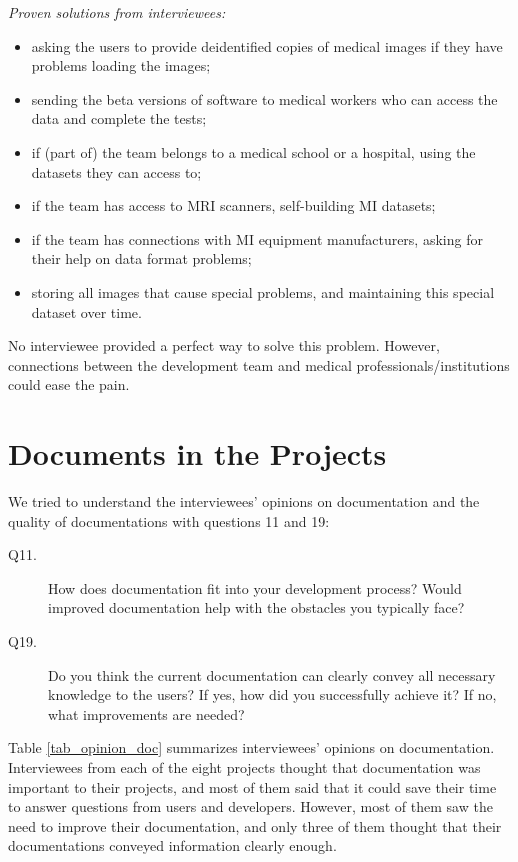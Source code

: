 \noindent\textit{Proven solutions from interviewees:}
\begin{itemize}
\item asking the users to provide deidentified copies of medical images if they have problems loading the images;
\item sending the beta versions of software to medical workers who can access the data and complete the tests;
\item if (part of) the team belongs to a medical school or a hospital, using the datasets they can access to;
\item if the team has access to MRI scanners, self-building MI datasets;
\item if the team has connections with MI equipment manufacturers, asking for their help on data format problems;
\item storing all images that cause special problems, and maintaining this special dataset over time.
\end{itemize}

No interviewee provided a perfect way to solve this problem. However, connections between the development team and medical professionals/institutions could ease the pain.

\section{Documents in the Projects}
\label{sec_interview_documents}
We tried to understand the interviewees' opinions on documentation and the quality of documentations with questions 11 and 19:

\begin{description}
\item[Q11.] How does documentation fit into your development process? Would improved documentation help with the obstacles you typically face?
\item[Q19.] Do you think the current documentation can clearly convey all necessary knowledge to the users? If yes, how did you successfully achieve it? If no, what improvements are needed?
\end{description}

Table \ref{tab_opinion_doc} summarizes interviewees' opinions on documentation. Interviewees from each of the eight projects thought that documentation was important to their projects, and most of them said that it could save their time to answer questions from users and developers. However, most of them saw the need to improve their documentation, and only three of them thought that their documentations conveyed information clearly enough. 

